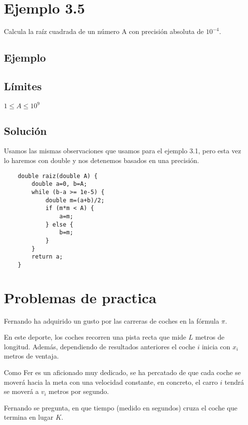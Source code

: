 \section*{Ejemplo 3.5}
Calcula la raíz cuadrada de un número A con precisión absoluta de \(10^{-4}\).
\subsection*{Ejemplo}
\begin{casebox2}
\end{casebox2}
\subsection*{Límites}
\begin{plimits}
	\item \(1\leq A \leq 10^9\)
\end{plimits}
\subsection*{Solución}
Usamos las mismas observaciones que usamos para el ejemplo 3.1, pero esta vez lo haremos con double y nos detenemos basados en una precisión.
\begin{lstlisting}
	double raiz(double A) {
		double a=0, b=A;
		while (b-a >= 1e-5) {
			double m=(a+b)/2;
			if (m*m < A) {
				a=m;
			} else {
				b=m;
			}
		}
		return a;
	}
\end{lstlisting}

\newpage
\section*{Problemas de practica}
\problemtitle Fernando ha adquirido un gusto por las carreras de coches en la fórmula \(\pi\).

En este deporte, los coches recorren una pista recta que mide \(L\) metros de longitud. Además, dependiendo de resultados anteriores el coche \(i\) inicia con \(x_i\) metros de ventaja.

Como Fer es un aficionado muy dedicado, se ha percatado de que cada coche se moverá hacia la meta con una velocidad constante, en concreto, el carro \(i\) tendrá se moverá a \(v_i\) metros por segundo.

Fernando se pregunta, en que tiempo (medido en segundos) cruza el coche que termina en lugar \(K\).

